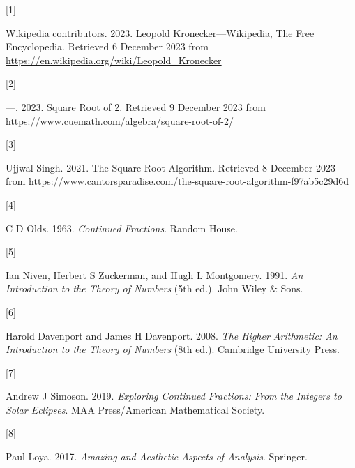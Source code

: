 \documentclass[
  a4paper,
]{article}
\newlength{\cslhangindent}
\newlength{\csllabelwidth}
\newenvironment{CSLReferences}[2] %
 {\begin{list}{}{%
  \setlength{\itemindent}{0pt}
  \setlength{\leftmargin}{0pt}
  \setlength{\parsep}{0pt}
  \ifodd #1
   \setlength{\leftmargin}{\cslhangindent}
   \setlength{\itemindent}{-1\cslhangindent}
  \fi
  \setlength{\itemsep}{#2\baselineskip}}}
 {\end{list}}
\newcommand{\CSLLeftMargin}[1]{\parbox[t]{\csllabelwidth}{\strut#1\strut}}
\newcommand{\CSLRightInline}[1]{\parbox[t]{\linewidth - \csllabelwidth}{\strut#1\strut}}
\begin{document}
\label{refs}
\begin{CSLReferences}{0}{0}
\CSLLeftMargin{{[}1{]} }%
\CSLRightInline{Wikipedia contributors. 2023. {Leopold
Kronecker---Wikipedia, The Free Encyclopedia}. Retrieved 6 December 2023
from \url{https://en.wikipedia.org/wiki/Leopold_Kronecker}}

\CSLLeftMargin{{[}2{]} }%
\CSLRightInline{---. 2023. {Square Root of 2}. Retrieved 9 December 2023
from \url{https://www.cuemath.com/algebra/square-root-of-2/}}

\CSLLeftMargin{{[}3{]} }%
\CSLRightInline{Ujjwal Singh. 2021. {The Square Root Algorithm}.
Retrieved 8 December 2023 from
\url{https://www.cantorsparadise.com/the-square-root-algorithm-f97ab5c29d6d}}

\CSLLeftMargin{{[}4{]} }%
\CSLRightInline{C D Olds. 1963. \emph{{Continued Fractions}}. Random
House.}

\CSLLeftMargin{{[}5{]} }%
\CSLRightInline{Ian Niven, Herbert S Zuckerman, and Hugh L Montgomery.
1991. \emph{{An Introduction to the Theory of Numbers}} (5th ed.). John
Wiley \& Sons.}

\CSLLeftMargin{{[}6{]} }%
\CSLRightInline{Harold Davenport and James H Davenport. 2008. \emph{{The
Higher Arithmetic}: {An Introduction to the Theory of Numbers}} (8th
ed.). Cambridge University Press.}

\CSLLeftMargin{{[}7{]} }%
\CSLRightInline{Andrew J Simoson. 2019. \emph{{Exploring Continued
Fractions}: {From the Integers to Solar Eclipses}}. MAA Press/American
Mathematical Society.}

\CSLLeftMargin{{[}8{]} }%
\CSLRightInline{Paul Loya. 2017. \emph{{Amazing and Aesthetic Aspects of
Analysis}}. Springer.}

\end{CSLReferences}
\end{document}

